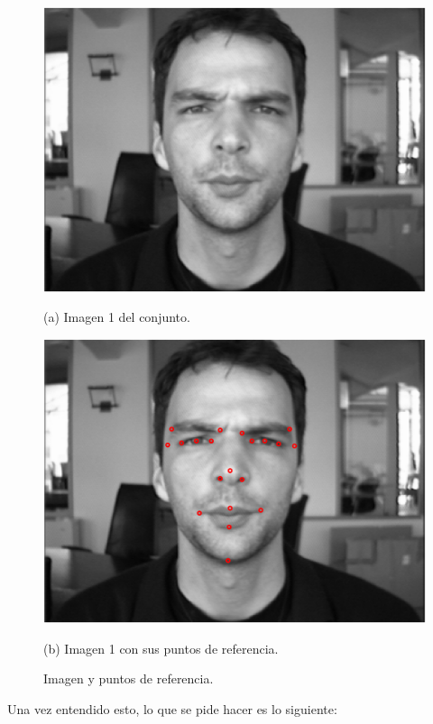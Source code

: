 \documentclass[11pt, letterpaper]{article}
\begin{document}
\begin{figure}[h!]
	\centering
	\begin{minipage}{0.4\textwidth}
		\centering
		\includegraphics[width=\textwidth]{IMG/R0.png}
		\caption*{(a) Imagen 1 del conjunto.}
	\end{minipage}\hfill
	\begin{minipage}{0.4\textwidth}
		\centering
		\includegraphics[width=\textwidth]{IMG/R1.png}
		\caption*{(b) Imagen 1 con sus puntos de referencia.}
	\end{minipage}
	\caption{Imagen y puntos de referencia.}
	\label{fig:r0_r1}
\end{figure}

Una vez entendido esto, lo que se pide hacer es lo siguiente:
\end{document}
